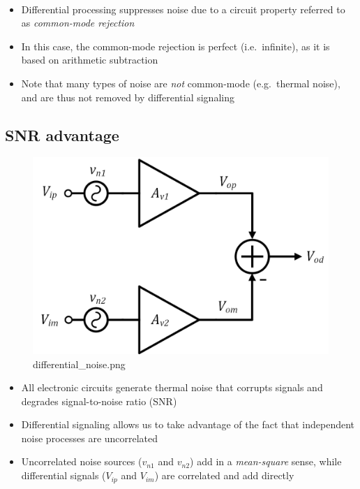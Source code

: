 \documentclass[11pt]{article}
\providecommand{\tightlist}{%
      \setlength{\itemsep}{0pt}\setlength{\parskip}{0pt}}
\begin{document}
    \begin{center}
    \end{center}
    { \hspace*{\fill} \\}
    
    \begin{itemize}
\tightlist
\item
  Differential processing suppresses noise due to a circuit property
  referred to as \emph{common-mode rejection}
\item
  In this case, the common-mode rejection is perfect (i.e.~infinite), as
  it is based on arithmetic subtraction
\item
  Note that many types of noise are \emph{not} common-mode (e.g.~thermal
  noise), and are thus not removed by differential signaling
\end{itemize}

    \hypertarget{snr-advantage}{%
\subsection{SNR advantage}\label{snr-advantage}}

    \begin{figure}
\centering
\includegraphics{differential_noise.png}
\caption{differential\_noise.png}
\end{figure}

    \begin{itemize}
\tightlist
\item
  All electronic circuits generate thermal noise that corrupts signals
  and degrades signal-to-noise ratio (SNR)
\item
  Differential signaling allows us to take advantage of the fact that
  independent noise processes are uncorrelated
\item
  Uncorrelated noise sources (\(v_{n1}\) and \(v_{n2}\)) add in a
  \emph{mean-square} sense, while differential signals (\(V_{ip}\) and
  \(V_{im}\)) are correlated and add directly
\end{itemize}
\end{document}
